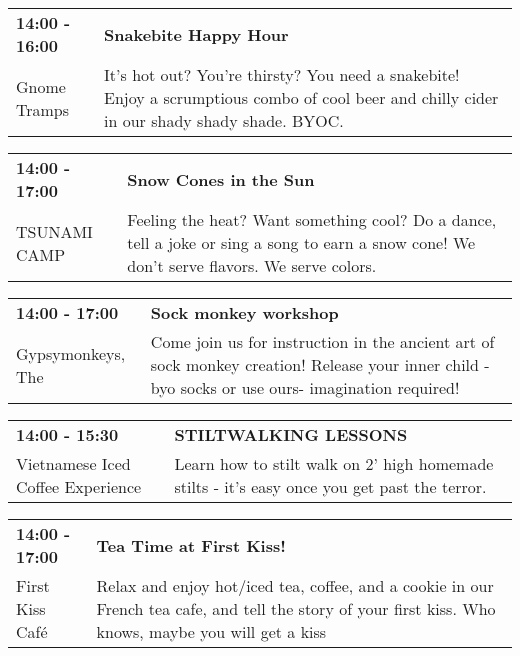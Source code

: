 \begin{tabular}{ p{1in} p{2.2in} }
    \textbf{14:00 - 16:00} & \textbf{Snakebite Happy Hour} \\
    Gnome Tramps \newline  & It's hot out? You're thirsty? You need a snakebite! Enjoy a scrumptious combo of cool beer and chilly cider in our shady shady shade. BYOC. \\
    \hline 
\end{tabular}
    
\begin{tabular}{ p{1in} p{2.2in} }
    \textbf{14:00 - 17:00} & \textbf{Snow Cones in the Sun} \\
    TSUNAMI CAMP \newline  & Feeling the heat?  Want something cool?
Do a dance, tell a joke or sing a song to earn a snow cone!  We don't serve flavors. We serve colors. \\
    \hline 
\end{tabular}
    
\begin{tabular}{ p{1in} p{2.2in} }
    \textbf{14:00 - 17:00} & \textbf{Sock monkey workshop} \\
    Gypsymonkeys, The \newline  & Come join us for instruction in the ancient art of sock monkey creation! Release your inner child - byo socks or use ours- imagination required! \\
    \hline 
\end{tabular}
    
\begin{tabular}{ p{1in} p{2.2in} }
    \textbf{14:00 - 15:30} & \textbf{STILTWALKING LESSONS} \\
    Vietnamese Iced Coffee Experience \newline  & Learn how to stilt walk on 2' high homemade stilts - it's easy once you get past the terror. \\
    \hline 
\end{tabular}
    
\begin{tabular}{ p{1in} p{2.2in} }
    \textbf{14:00 - 17:00} & \textbf{Tea Time at First Kiss!} \\
    First Kiss Caf\'e \newline  & Relax and enjoy hot/iced tea, coffee, and a cookie in our French tea cafe, and tell the story of your first kiss. Who knows, maybe you will get a kiss \\
    \hline 
\end{tabular}
    
